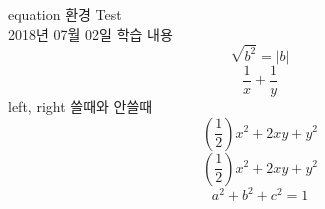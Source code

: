 \documentclass{oblivoir}
\begin{document}
	equation 환경 Test \\ 2018년 07월 02일 학습 내용
	\begin{equation} 
		\sqrt{b^2} = |b|\label{1}
	\end{equation}
	\begin{equation} 
		\frac{1}{x} + \frac{1}{y} \label{2}
	\end{equation}
	left, right 쓸때와 안쓸때
	\begin{equation} 
		\left(\frac{1}{2}\right) x^2+2xy+y^2\label{3}
	\end{equation}
	\begin{equation} 
		(\frac{1}{2})x^2+2xy+y^2\label{1}
	\end{equation}
	\begin{equation} 
		a^2+b^2+c^2=1\label{1}
	\end{equation}
\end{document}
